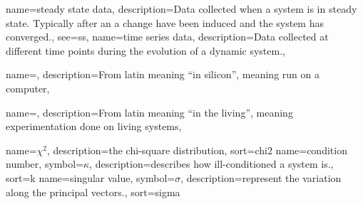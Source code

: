 {
  name={steady state data},
  description={Data collected when a system is in steady state. Typically after an a change have been induced and the system has converged.},
  see={ss},
}
{
  name={time series data},
  description={Data collected at different time points during the evolution of a dynamic system.},
}

{
  name={\insilico},
  description={From latin meaning ``in silicon'', meaning run on a computer},
}

{
  name={\invivo},
  description={From latin meaning ``in the living'', meaning experimentation done on living systems},
}



{
  name={\ensuremath{\chi^2}},
  description={the chi-square distribution},
  sort=chi2
}
{
  name={condition number},
  symbol={\ensuremath{\kappa}},
  description={describes how ill-conditioned a system is.},
  sort=k
}
{
  name={singular value},
  symbol={\ensuremath{\sigma}},
  description={represent the variation along the principal vectors.},
  sort=sigma
}
